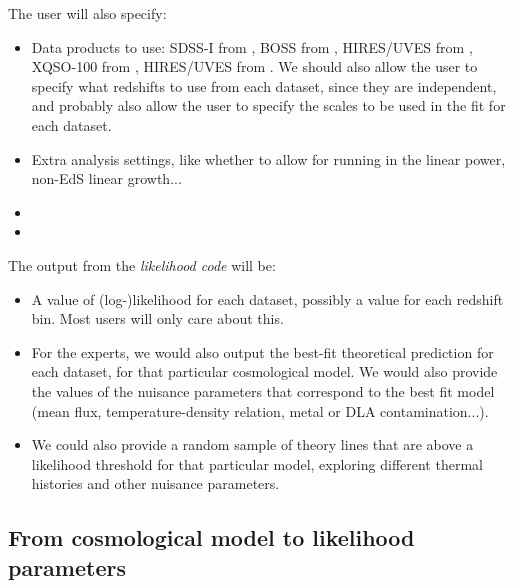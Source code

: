 The user will also specify:
\begin{itemize}
 \item Data products to use: 
  SDSS-I from \cite{McDonald2006}, 
  BOSS from \cite{Palanque-Delabrouille2013},
  HIRES/UVES from \cite{Viel2013},
  XQSO-100 from \cite{Irsic2017}, 
  HIRES/UVES from \cite{Walther2018a}. 
  We should also allow the user to specify what redshifts to use from each
  dataset, since they are independent, and probably also allow the user 
  to specify the scales to be used in the fit for each dataset.
 \item Extra analysis settings, like whether to allow for running in the 
  linear power, non-EdS linear growth...
 \item {}
 \item {}
\end{itemize}

The output from the \textit{likelihood code} will be:
\begin{itemize}
 \item A value of (log-)likelihood for each dataset, possibly a value for 
  each redshift bin. 
  Most users will only care about this.
 \item For the experts, we would also output the best-fit theoretical 
  prediction for each dataset, for that particular cosmological model.
  We would also provide the values of the nuisance parameters that correspond
  to the best fit model (mean flux, temperature-density relation, metal or DLA
  contamination...).
 \item We could also provide a random sample of theory lines that are above a 
  likelihood threshold for that particular model, exploring different 
  thermal histories and other nuisance parameters.
\end{itemize}


\subsection{From cosmological model to likelihood parameters}

